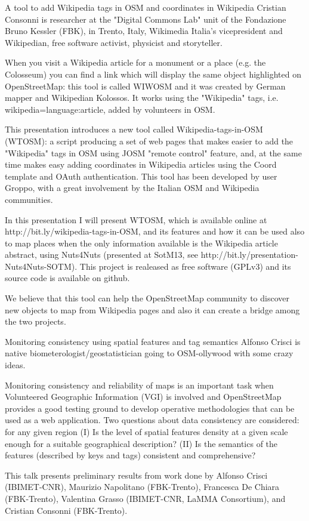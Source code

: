%
{A tool to add Wikipedia tags in OSM and coordinates in Wikipedia}%
{Cristian Consonni is researcher at the "Digital Commons Lab" unit of the Fondazione Bruno Kessler (FBK), in Trento, Italy, Wikimedia Italia's vicepresident and Wikipedian, free software activist, physicist and storyteller.}%
{When you visit a Wikipedia article for a monument or a place (e.g. the Colosseum) you can find a link which will display the same object highlighted on OpenStreetMap: this tool is called WIWOSM and it was created by German mapper and Wikipedian Kolossos. It works using the "Wikipedia" tags, i.e. wikipedia=language:article, added by volunteers
in OSM.

This presentation introduces a new tool called Wikipedia-tags-in-OSM (WTOSM): a script producing a set of web pages that makes easier to add the "Wikipedia" tags in OSM using JOSM "remote control" feature, and, at the same time makes easy adding coordinates in Wikipedia articles using the {{Coord}} template and OAuth authentication. This tool has been developed by user Groppo, with a great involvement by
the Italian OSM and Wikipedia communities.

In this presentation I will present WTOSM, which is available online at http://bit.ly/wikipedia-tags-in-OSM, and its features and how it
can be used also to map places when the only information available is the Wikipedia article abstract, using Nuts4Nuts (presented at SotM13,
see http://bit.ly/presentation-Nuts4Nuts-SOTM). This project is realeased as free software (GPLv3) and its source code is available on
github.

We believe that this tool can help the OpenStreetMap community to discover new objects to map from Wikipedia pages and also it can
create a bridge among the two projects.}

%
{Monitoring consistency using spatial features and tag semantics}%
{Alfonso Crisci is native biometerologist/geostatistician going to OSM-ollywood with some crazy ideas.}%
{Monitoring consistency and reliability of maps is an important task when Volunteered Geographic Information (VGI) is involved and OpenStreetMap provides a good testing ground to develop operative methodologies that can be used as a web application. Two questions about data consistency are considered: for any given region (I) Is the level of spatial features density at a given scale enough for a suitable geographical description? (II) Is the semantics of the features (described by keys and tags) consistent and comprehensive?

This talk presents preliminary results from work done by Alfonso Crisci (IBIMET-CNR), Maurizio Napolitano (FBK-Trento), Francesca De Chiara (FBK-Trento), Valentina Grasso (IBIMET-CNR, LaMMA Consortium), and Cristian Consonni (FBK-Trento).}

